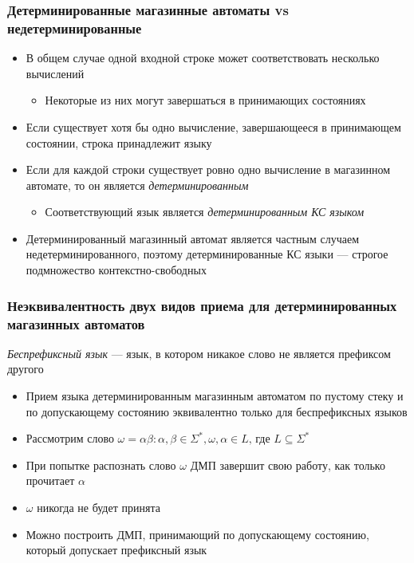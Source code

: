 \documentclass[dvipsnames]{beamer}
\begin{document}
\begin{frame}[fragile]
  \frametitle{Детерминированные магазинные автоматы vs недетерминированные}
\begin{itemize}
	\item В общем случае одной входной строке может соответствовать несколько вычислений
	\begin{itemize}
		\item Некоторые из них могут завершаться в принимающих состояниях
	\end{itemize}
	\item Если существует хотя бы одно вычисление, завершающееся в принимающем состоянии, строка принадлежит языку
	\item Если для каждой строки существует ровно одно вычисление в магазинном автомате, то он является \emph{детерминированным}
	\begin{itemize}
		\item Соответствующий язык является \emph{детерминированным КС языком}
	\end{itemize}
	\item Детерминированный магазинный автомат является частным случаем недетерминированного, поэтому детерминированные КС языки --- строгое подмножество контекстно-свободных
\end{itemize}
\end{frame}

\begin{frame}[fragile]
  \frametitle{Неэквивалентность двух видов приема для детерминированных магазинных автоматов}

  \emph{Беспрефиксный язык} --- язык, в котором никакое слово не является префиксом другого

  \begin{itemize}
    \item Прием языка детерминированным магазинным автоматом по пустому стеку и по допускающему состоянию эквивалентно только для беспрефиксных языков
    \item Рассмотрим слово $\omega = \alpha \beta: \alpha, \beta \in \Sigma^*, \omega, \alpha \in L \text{, где } L \subseteq \Sigma^*$
    \item При попытке распознать слово $\omega$ ДМП завершит свою работу, как только прочитает $\alpha$
    \item $\omega$ никогда не будет принята
    \item Можно построить ДМП, принимающий по допускающему состоянию, который допускает префиксный язык
  \end{itemize}
\end{frame}
\end{document}
